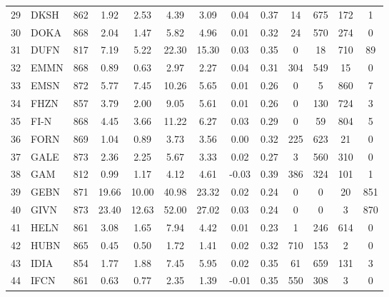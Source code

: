 \documentclass[11pt,a4paper]{article}
\begin{document}
\begin{doublespacing}
\begin{small}
\begin{longtable}{llc|cc|cc|cc|cccc}
                29  & DKSH  & 862 & 1.92   & 2.53     & 4.39   & 3.09     & 0.04  & 0.37     & 14    & 675   & 172   & 1     \\
                30  & DOKA  & 868 & 2.04   & 1.47     & 5.82   & 4.96     & 0.01  & 0.32     & 24    & 570   & 274   & 0     \\
                31  & DUFN  & 817 & 7.19   & 5.22     & 22.30  & 15.30    & 0.03  & 0.35     & 0     & 18    & 710   & 89    \\
                32  & EMMN  & 868 & 0.89   & 0.63     & 2.97   & 2.27     & 0.04  & 0.31     & 304   & 549   & 15    & 0     \\
                33  & EMSN  & 872 & 5.77   & 7.45     & 10.26  & 5.65     & 0.01  & 0.26     & 0     & 5     & 860   & 7     \\
                34  & FHZN  & 857 & 3.79   & 2.00     & 9.05   & 5.61     & 0.01  & 0.26     & 0     & 130   & 724   & 3     \\
                35  & FI-N  & 868 & 4.45   & 3.66     & 11.22  & 6.27     & 0.03  & 0.29     & 0     & 59    & 804   & 5     \\
                36  & FORN  & 869 & 1.04   & 0.89     & 3.73   & 3.56     & 0.00  & 0.32     & 225   & 623   & 21    & 0     \\
                37  & GALE  & 873 & 2.36   & 2.25     & 5.67   & 3.33     & 0.02  & 0.27     & 3     & 560   & 310   & 0     \\
                38  & GAM   & 812 & 0.99   & 1.17     & 4.12   & 4.61     & -0.03 & 0.39     & 386   & 324   & 101   & 1     \\
                39  & GEBN  & 871 & 19.66  & 10.00    & 40.98  & 23.32    & 0.02  & 0.24     & 0     & 0     & 20    & 851   \\
                40  & GIVN  & 873 & 23.40  & 12.63    & 52.00  & 27.02    & 0.03  & 0.24     & 0     & 0     & 3     & 870   \\
                41  & HELN  & 861 & 3.08   & 1.65     & 7.94   & 4.42     & 0.01  & 0.23     & 1     & 246   & 614   & 0     \\
                42  & HUBN  & 865 & 0.45   & 0.50     & 1.72   & 1.41     & 0.02  & 0.32     & 710   & 153   & 2     & 0     \\
                43  & IDIA  & 854 & 1.77   & 1.88     & 7.45   & 5.95     & 0.02  & 0.35     & 61    & 659   & 131   & 3     \\
                44  & IFCN  & 861 & 0.63   & 0.77     & 2.35   & 1.39     & -0.01 & 0.35     & 550   & 308   & 3     & 0     \\

\end{longtable}
\end{small}
\end{doublespacing}
\end{document}
